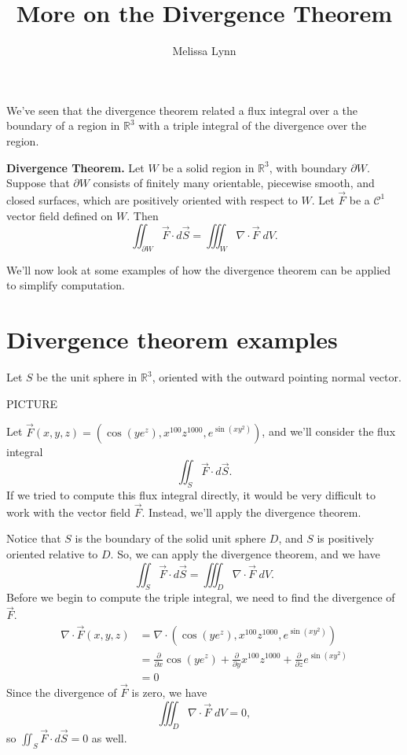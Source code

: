 \documentclass{ximera}
\title{More on the Divergence Theorem}
\author{Melissa Lynn}
\begin{document}
  
\begin{abstract}  
\end{abstract}  
\maketitle 

We've seen that the divergence theorem related a flux integral over a the boundary of a region in $\mathbb{R}^3$ with a triple integral of the divergence over the region.

\begin{theorem}
\textbf{Divergence Theorem.} Let $W$ be a solid region in $\mathbb{R}^3$, with boundary $\partial W$. Suppose that $\partial W$ consists of finitely many orientable, piecewise smooth, and closed surfaces, which are positively oriented with respect to $W$. Let $\vec{F}$ be a $\mathcal{C}^1$ vector field defined on $W$. Then
\[
\iint_{\partial W} \vec{F}\cdot d\vec{S} = \iiint_W \nabla\cdot \vec{F}\;dV.
\]
\end{theorem}

We'll now look at some examples of how the divergence theorem can be applied to simplify computation.

\section*{Divergence theorem examples}

\begin{example}
Let $S$ be the unit sphere in $\mathbb{R}^3$, oriented with the outward pointing normal vector.

PICTURE

Let $\vec{F}(x,y,z) = \left(\cos(ye^z), x^{100}z^{1000}, e^{\sin(xy^2)}\right)$, and we'll consider the flux integral
\[
\iint_S\vec{F}\cdot d\vec{S}.
\]
If we tried to compute this flux integral directly, it would be very difficult to work with the vector field $\vec{F}$. Instead, we'll apply the divergence theorem.

Notice that $S$ is the boundary of the solid unit sphere $D$, and $S$ is positively oriented relative to $D$. So, we can apply the divergence theorem, and we have
\[
\iint_{S} \vec{F}\cdot d\vec{S} = \iiint_D \nabla\cdot \vec{F}\;dV.
\]
Before we begin to compute the triple integral, we need to find the divergence of $\vec{F}$.
\begin{align*}
\nabla\cdot \vec{F}(x,y,z) &= \nabla \cdot \left(\cos(ye^z), x^{100}z^{1000}, e^{\sin(xy^2)}\right)\\
&= \frac{\partial}{\partial x}\cos(ye^z) + \frac{\partial}{\partial y}x^{100}z^{1000} +  \frac{\partial}{\partial z}e^{\sin(xy^2)}\\
&= 0
\end{align*}
Since the divergence of $\vec{F}$ is zero, we have
\[
 \iiint_D \nabla\cdot \vec{F}\;dV = 0,
\]
so $\iint_{S} \vec{F}\cdot d\vec{S}  = 0$ as well. 
\end{example}
\end{document}

